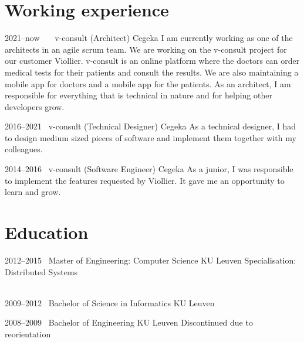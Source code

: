 \documentclass[a4paper]{friggeri-cv} %
\begin{document}
\section{Working experience}
\begin{entrylist}
\entry
{2021--now~~~} %
{v-consult (Architect)}
{Cegeka}
{I am currently working as one of the architects in an agile scrum team. We are working on the v-consult project for our customer Viollier.
v-consult is an online platform where the doctors can order medical tests for their patients and consult the results.
We are also maintaining a mobile app for doctors and a mobile app for the patients.
As an architect, I am responsible for everything that is technical in nature and for helping other developers grow.}


\entry
{2016--2021~} %
{v-consult (Technical Designer)}
{Cegeka}
{As a technical designer, I had to design medium sized pieces of software and implement them together with my colleagues.}


\entry
{2014--2016~} %
{v-consult (Software Engineer)}
{Cegeka}
{As a junior, I was responsible to implement the features requested by Viollier. It gave me an opportunity to learn and grow.}


\end{entrylist}

\section{Education}

\begin{entrylist}
\entry
{2012--2015~}
{Master of Engineering: Computer Science}
{KU Leuven}
{Specialisation: Distributed Systems\\
~}


\entry
{2009--2012~}
{Bachelor of Science in Informatics}
{KU Leuven}
{~}

\entry
{2008--2009~}
{Bachelor of Engineering}
{KU Leuven}
{Discontinued due to reorientation}
\end{entrylist}


\end{document}
